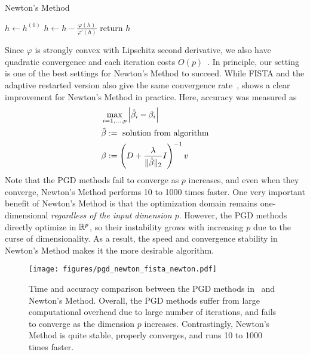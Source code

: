 \begin{algorithm}[t]
    \caption{Newton's Method}\label{alg:newton:newton}
    $h \gets h^{(0)}$\;
     {
        $h \gets h - \frac{\varphi(h)}{\varphi'(h)}$\;
    }
    return $h$\;
\end{algorithm}

Since $\varphi$ is strongly convex with Lipschitz second derivative,
we also have quadratic convergence and each iteration costs $O(p)$~\citep{boyd:2004}.
In principle, our setting is one of the best settings for Newton's Method to succeed.
While FISTA 
and the adaptive restarted version
also give the same convergence rate~\citep{beck:2009,odonoghue:2015},
 shows a clear improvement for Newton's Method in practice.
Here, accuracy was measured as
\begin{align}
    &\max\limits_{i=1,\ldots,p} 
    \left|\hat{\beta}_i - \beta_i\right|
    \label{eq:accuracy}
    \\
    &\hat{\beta} 
    :=
    \text{ solution from algorithm}
    \nonumber
    \\
    &\beta
    :=
    \left(D + \frac{\lambda}{\|\hat{\beta}\|_2} I\right)^{-1} v
    \nonumber
\end{align}
Note that the PGD methods fail to converge as $p$ increases,
and even when they converge, Newton's Method performs 10 to 1000 times faster.
One very important benefit of Newton's Method 
is that the optimization domain remains one-dimensional \emph{regardless of the input dimension $p$}.
However, the PGD methods directly optimize in $\mathbb{R}^p$,
so their instability grows with increasing $p$ due to the curse of dimensionality.
As a result, the speed and convergence stability in Newton's Method 
makes it the more desirable algorithm.

\begin{figure}[t]
    \centering
    \texttt{[image: figures/pgd\_newton\_fista\_newton.pdf]}
    \caption{Time and accuracy comparison between the PGD methods 
    in~ and Newton's Method.
    Overall, the PGD methods suffer from large computational overhead due to large number of iterations,
    and fails to converge as the dimension $p$ increases.
    Contrastingly, Newton's Method is quite stable, properly converges, and runs 10 to 1000 times faster.
    }
    \label{fig:newton:pgd-newton}
\end{figure}

